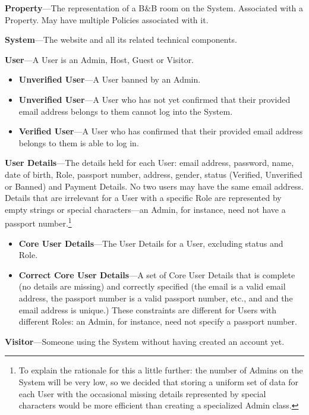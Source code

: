 \textbf{Property}---The representation of a B\&B room on the System. Associated with a Property. May have multiple Policies associated with it.

\textbf{System}---The website and all its related technical components.

\textbf{User}---A User is an Admin, Host, Guest or Visitor.
\begin{itemize}
    \item \textbf{Unverified User}---A User banned by an Admin.
\item \textbf{Unverified User}---A User who has not yet confirmed that their provided email address belongs to them cannot log into the System.
\item \textbf{Verified User}---A User who has confirmed that their provided email address belongs to them is able to log in. 
\end{itemize}

\textbf{User Details}---The details held for each User: email address, password, name, date of birth, Role, passport number, address, gender, status (Verified, Unverified or Banned) and Payment Details. No two users may have the same email address. Details that are irrelevant for a User with a specific Role are represented by empty strings or special characters---an Admin, for instance, need not have a passport number.\footnote{To explain the rationale for this a little further: the number of Admins on the System will be very low, so we decided that storing a uniform set of data for each User with the occasional missing details represented by special characters would be more efficient than creating a specialized Admin class.}
\begin{itemize}
    \item \textbf{Core User Details}---The User Details for a User, excluding status and Role.
    \item \textbf{Correct Core User Details}---A set of Core User Details that is complete (no details are missing) and correctly specified (the email is a valid email address, the passport number is a valid passport number, etc., and and the email address is unique.) These constraints are different for Users with different Roles: an Admin, for instance, need not specify a passport number.
\end{itemize}

\textbf{Visitor}---Someone using the System without having created an account yet.
